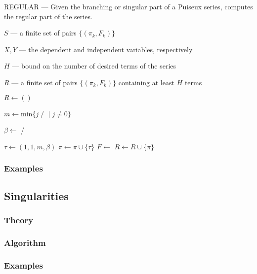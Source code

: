 \documentclass{article}
\newcommand{\Input}{\Require}
\newcommand{\Output}{\Ensure}
\newcommand{\ForEach}{\ForAll}
\begin{document}
\begin{algorithm}[h]
\caption{REGULAR --- Given the branching or singular part of a Puiseux
  series, computes the regular part of the series.}
\label{alg: puiseux-regular}
\begin{algorithmic}[1]
\Input

$S$ --- a finite set of pairs $\{(\pi_k,F_k)\}$

$X,Y$ --- the dependent and independent variables, respectively

$H$ --- bound on the number of desired terms of the series

\Output $R$ --- a finite set of pairs $\{(\pi_k,F_k)\}$ containing at
least $H$ terms

  \State $R \leftarrow ()$
  \ForEach{$(\pi,F)$ {\bf in} $S$}

      \State $m \leftarrow \text{min} \{ j \; /$
       $ \; | \; j \neq 0 \}$

      \State $\beta \leftarrow$  /

      \State $\tau \leftarrow (1,1,m,\beta)$
      \State $\pi \leftarrow \pi \cup \{\tau\}$
      \State $F \leftarrow$ 
    \EndWhile
    \State $R \leftarrow R \cup \{\pi\}$
  \EndFor
\EndFunction
\end{algorithmic}
\end{algorithm}


\subsubsection{Examples}
%

\subsection{Singularities}

%
\subsubsection{Theory}
%
%
\subsubsection{Algorithm}
%
%
\subsubsection{Examples}
%
\end{document}
